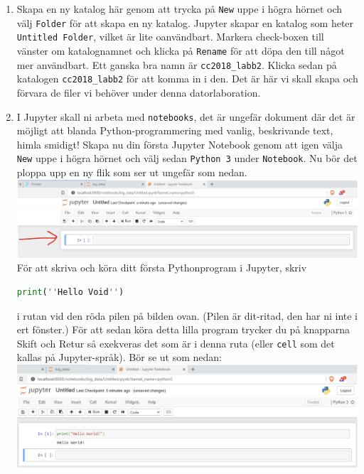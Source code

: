 \documentclass{article}
\begin{document}
\begin{enumerate}
  Jupyter körs som en server på din dator, så du har nu med framgång loggat in som användare på denna server. Det som syns på bilden ovan är de filer och kataloger som finns i din hemkatalog, alltså på min dator det som finns i \verb+C:\Users\perand+, där \verb+perand+ är mitt användarnamn.
\item Skapa en ny katalog här genom att trycka på \verb+New+ uppe i högra hörnet och välj \verb+Folder+ för att skapa en ny katalog. Jupyter skapar en katalog som heter \verb+Untitled Folder+, vilket är lite oanvändbart. Markera check-boxen till vänster om katalognamnet och klicka på \verb+Rename+ för att döpa den till något mer användbart. Ett ganska bra namn är \verb+cc2018_labb2+. Klicka sedan på katalogen \verb+cc2018_labb2+ för att komma in i den. Det är här vi skall skapa och förvara de filer vi behöver under denna datorlaboration.
\item I Jupyter skall ni arbeta med \verb+notebooks+, det är ungefär dokument där det är möjligt att blanda Python-programmering med vanlig, beskrivande text, himla smidigt! Skapa nu din första Jupyter Notebook genom att igen välja \verb+New+ uppe i högra hörnet och välj sedan \verb+Python 3+ under \verb+Notebook+. Nu bör det ploppa upp en ny flik som ser ut ungefär som nedan.	\\
  \includegraphics[width=\textwidth]{figures/anaconda3.png}\\
För att skriva och köra ditt första Pythonprogram i Jupyter, skriv
  \begin{lstlisting}[language=Python]
    print(''Hello Void'')
    \end{lstlisting}
i rutan vid den röda pilen på bilden ovan. (Pilen är dit-ritad, den har ni inte i ert fönster.) För att sedan köra detta lilla program trycker du på knapparna Skift och Retur så exekveras det som är i denna ruta (eller \verb+cell+ som det kallas på Jupyter-språk). Bör se ut som nedan:\\
  \includegraphics[width=\textwidth]{figures/anaconda4.png}

\end{enumerate}
\end{document}
